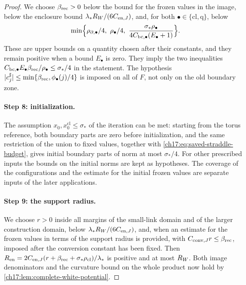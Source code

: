 \begin{proof}
We choose $\beta_{\mathrm{rec}}>0$ below the bound for the frozen values in the image, below the enclosure bound $\lambda_*R_W/(6C_{\mathrm{en},J})$, and, for both $\bullet\in\{\mathrm{cl},\mathrm q\}$, below
\begin{equation}\label{ch17:eq:saved-straddle-budget}
 \min\Bigl\{\rho_{\partial,\bullet}/4,\ \rho_\bullet/4,\ \frac{\sigma_*\rho_\bullet}{4C_{\mathrm{bc},\bullet}(E_\bullet+1)}\Bigr\}.
\end{equation}
These are upper bounds on a quantity chosen after their constants, and they remain positive when a bound $E_\bullet$ is zero. They imply the two inequalities $C_{\mathrm{bc},\bullet}E_\bullet\beta_{\mathrm{rec}}/\rho_\bullet\le\sigma_*/4$ in the statement. The hypothesis $\lvert c_j^\sharp\rvert\le\min\{\beta_{\mathrm{rec}},\phi_\bullet(j)/4\}$ is imposed on all of $F$, not only on the old boundary zone.

\paragraph{Step 8: initialization.}
The assumption $x_0,x_0^{\mathrm{cl}}\le\sigma_*$ of the iteration can be met: starting from the torus reference, both boundary parts are zero before initialization, and the same restriction of the union to fixed values, together with \eqref{ch17:eq:saved-straddle-budget}, gives initial boundary parts of norm at most $\sigma_*/4$. For other prescribed inputs the bounds on the initial norms are kept as hypotheses. The coverage of the configurations and the estimate for the initial frozen values are separate inputs of the later applications.

\paragraph{Step 9: the support radius.}
We choose $r>0$ inside all margins of the small-link domain and of the larger construction domain, below $\lambda_*R_W/(6C_{\mathrm{en},J})$, and, when an estimate for the frozen values in terms of the support radius is provided, with $C_{\mathrm{conv},J}r\le\beta_{\mathrm{rec}}$, imposed after the conversion constant has been fixed. Then $R_{\mathrm{en}}=2C_{\mathrm{en},J}(r+\beta_{\mathrm{rec}}+\sigma_*\rho_{\mathrm{cl}})/\lambda_*$ is positive and at most $R_W$. Both image denominators and the curvature bound on the whole product now hold by \cref{ch17:lem:complete-white-potential}.


\end{proof}
